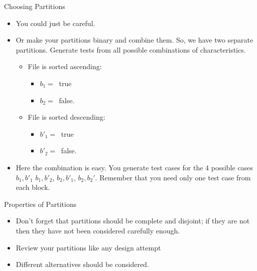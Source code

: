 \documentclass{beamer}
\newcommand{\pauseslide}{}
\begin{document}
\begin{frame}{Choosing Partitions}

  \begin{itemize}
  \item You could just be careful.
  \item Or make your partitions binary and combine them. So, we have two
    separate partitions. Generate tests from all possible combinations of
    characteristics. 
    \begin{itemize}
    \item File is sorted ascending:
      \begin{itemize}
      \item $b_1 = \ $ true
      \item $b_2 = \ $ false.
      \end{itemize}
    \item File is sorted descending:
      \begin{itemize}
      \item $b'_1 = \ $ true
      \item $b'_2 = \ $ false.
      \end{itemize}
    \end{itemize}
  \item Here the combination  is easy.
You generate test cases for the 4 possible cases $b_1,b'_1$
$b_1,b'_2$, $b_2,b'_1$, $b_2,b_2'$.
Remember that you need only one test case from each block.

  \end{itemize} 
\end{frame}
\begin{frame}{Properties of Partitions}
  \begin{itemize}
  \item Don't forget that partitions should be complete and disjoint;
    if they are not then they have not been considered carefully
    enough.
    \item Review your partitions like any design attempt
    \item Different alternatives should be considered.
  \end{itemize}
\end{frame}

\pauseslide
\end{document}
